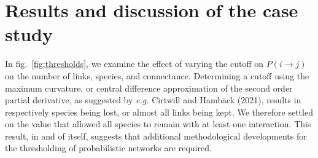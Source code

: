 \documentclass[11pt]{article}
\begin{document}
\hypertarget{results-and-discussion-of-the-case-study}{%
\section{Results and discussion of the case
study}\label{results-and-discussion-of-the-case-study}}

In fig.~\ref{fig:thresholds}, we examine the effect of varying the
cutoff on \(P(i \rightarrow j)\) on the number of links, species, and
connectance. Determining a cutoff using the maximum curvature, or
central difference approximation of the second order partial derivative,
as suggested by \emph{e.g.} Cirtwill and Hambäck (2021), results in
respectively species being lost, or almost all links being kept. We
therefore settled on the value that allowed all species to remain with
at least one interaction. This result, in and of itself, suggests that
additional methodological developments for the thresholding of
probabilistic networks are required.
\end{document}
